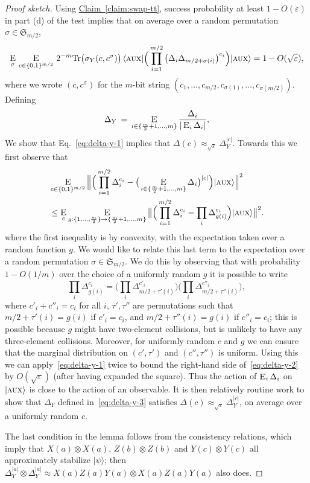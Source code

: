 \documentclass[11pt]{article}
\numberwithin{equation}{section}
\theoremstyle{definition}
\theoremstyle{plain}
\newcommand{\expref}[2]{\hyperref[#2]{#1~\ref{#2}}}
\newcommand{\ket}[1]{|#1\rangle}
\newcommand{\bra}[1]{\langle#1|}
\newcommand{\Tr}{\mbox{\rm Tr}}
\newcommand{\Es}[1]{\ensuremath{\mathop{\textsc{E}}}_{#1}} %
\newcommand{\eps}{\varepsilon}
\newcommand{\aux}{\textsc {aux}}
\begin{document}
\begin{proof}[Proof sketch]
Using \expref{Claim}{claim:swap-tt}, %
success probability at least $1-O(\eps)$ in part (d) of the test implies that on average over a random permutation $\sigma \in \mathfrak{S}_{m/2}$, 
\begin{equation}\label{eq:delta-y-1}
 \Es{\sigma} \,\Es{c\in\{0,1\}^{m/2}}\,2^{-m}\Tr \big(\sigma_Y(c,c^\sigma)\big)\,\bra{\aux} \Big( \prod_{i=1}^{m/2}\big( \Delta_i \Delta_{m/2+ \sigma(i)} \big)^{c_i} \Big) \ket{\aux}  = 1- O(\sqrt{\eps}),
\end{equation}
where we wrote $(c,c^\sigma)$ for the $m$-bit string $(c_1,\ldots,c_{m/2},c_{\sigma(1)},\ldots,c_{\sigma(m/2)})$. Defining
 \begin{equation}\label{eq:delta-y-3}
\Delta_Y \,=\, \Es{i\in\{\frac{m}{2}+1,\ldots,m\}} \frac{\Delta_i}{|\Es{i} \Delta_i|},
\end{equation}
We show that Eq.~\eqref{eq:delta-y-1} implies that $\Delta(c) \approx_{\sqrt{\eps}} \Delta_Y^{|c|}$. Towards this we first observe that
\begin{align}
  &\Es{c\in\{0,1\}^{m/2}} \Big\| \Big(\prod_{i=1}^{m/2} \Delta_i^{c_i} -
  \big(\Es{i\in\{\frac{m}{2}+1,\ldots,m\}} \Delta_{i}\big)^{|c|}\Big) \ket{\aux}
  \Big\|^2\\&\leq 
\Es{c} \Es{g:\{1,\ldots,\frac{m}{2}\}\to\{\frac{m}{2}+1,\ldots,m\}} \big\|\Big(\prod_{i=1}^{m/2} \Delta_i^{c_i} - \prod_i \Delta_{g(i)}^{c_i}\Big) \ket{\aux} \big\|^2.\label{eq:delta-y-2}
\end{align}
where the first inequality is by convexity, with the expectation taken over a random function $g$. We would like to relate this last term to the expectation over a random permutation $\sigma\in\mathfrak{S}_{m/2}$. We do this by observing that with  probability $1-O(1/m)$ over the choice of a uniformly random $g$ it is possible to write
$$ \prod_i \Delta_{g(i)}^{c_i} = \Big(\prod_i \Delta_{m/2+\tau'(i)}^{c'_i}\Big)\Big(\prod_i \Delta_{m/2+\tau''(i)}^{c''_i}\Big),$$
where $c'_i+c''_i=c_i$ for all $i$, $\tau',\tau''$ are permutations such that $m/2+\tau'(i)=g(i)$ if $c'_i=c_i$, and $m/2+\tau''(i)=g(i)$ if $c''_i=c_i$; this is possible because $g$ might have two-element collisions, but is unlikely to have any three-element collisions. Moreover, for uniformly random $c$ and $g$ we can ensure that the marginal distribution on $(c',\tau')$ and $(c'',\tau'')$ is uniform.  Using this we can apply~\eqref{eq:delta-y-1} twice to bound the right-hand side of~\eqref{eq:delta-y-2} by $O(\sqrt{\eps})$ (after having expanded the square). Thus the action of $\Es{i}\Delta_i$ on $\ket{\aux}$ is close to the action of an observable. It is then relatively routine work to show that $\Delta_Y$ defined in~\eqref{eq:delta-y-3} satisfies $\Delta(c) \approx_{\sqrt{\eps}} \Delta_Y^{|c|}$, on average over a uniformly random $c$. 

The last condition in the lemma follows from the consistency relations, which imply that $X(a)\otimes X(a)$, $Z(b)\otimes Z(b)$ and $Y(c)\otimes Y(c)$ all approximately stabilize $\ket{\psi}$; then $\Delta_Y^{|a|} \otimes \Delta_Y^{|a|} \approx  X(a)Z(a)Y(a) \otimes X(a)Z(a)Y(a)$ also does. 
\end{proof}
\end{document}
